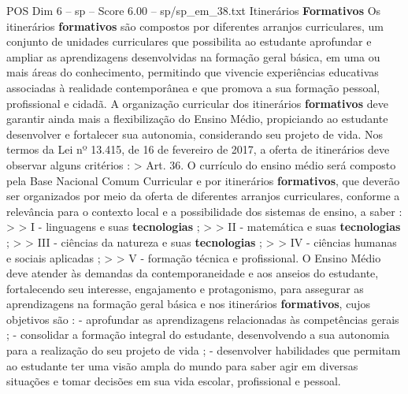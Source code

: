 \begin{textsample}{POS Dim 6 – sp – Score 6.00 – sp/sp\_em\_38.txt}  \label{ex:f6_pos_088}
Itinerários \textbf{Formativos} Os itinerários \textbf{formativos} são compostos por diferentes arranjos curriculares, um conjunto de unidades curriculares que possibilita ao estudante aprofundar e ampliar as aprendizagens desenvolvidas na formação geral básica, em uma ou mais áreas do conhecimento, permitindo que vivencie experiências educativas associadas à realidade contemporânea e que promova a sua formação pessoal, profissional e cidadã.
A organização curricular dos itinerários \textbf{formativos} deve garantir ainda mais a flexibilização do Ensino Médio, propiciando ao estudante desenvolver e fortalecer sua autonomia, considerando seu projeto de vida.
Nos termos da Lei nº 13.415, de 16 de fevereiro de 2017, a oferta de itinerários deve observar alguns critérios : > Art. 36.
O currículo do ensino médio será composto pela Base Nacional Comum Curricular e por itinerários \textbf{formativos}, que deverão ser organizados por meio da oferta de diferentes arranjos curriculares, conforme a relevância para o contexto local e a possibilidade dos sistemas de ensino, a saber : > > I - linguagens e suas \textbf{tecnologias} ; > > II - matemática e suas \textbf{tecnologias} ; > > III - ciências da natureza e suas \textbf{tecnologias} ; > > IV - ciências humanas e sociais aplicadas ; > > V - formação técnica e profissional.
O Ensino Médio deve atender às demandas da contemporaneidade e aos anseios do estudante, fortalecendo seu interesse, engajamento e protagonismo, para assegurar as aprendizagens na formação geral básica e nos itinerários \textbf{formativos}, cujos objetivos são : - aprofundar as aprendizagens relacionadas às competências gerais ; - consolidar a formação integral do estudante, desenvolvendo a sua autonomia para a realização do seu projeto de vida ; - desenvolver habilidades que permitam ao estudante ter uma visão ampla do mundo para saber agir em diversas situações e tomar decisões em sua vida escolar, profissional e pessoal.

\end{textsample}
